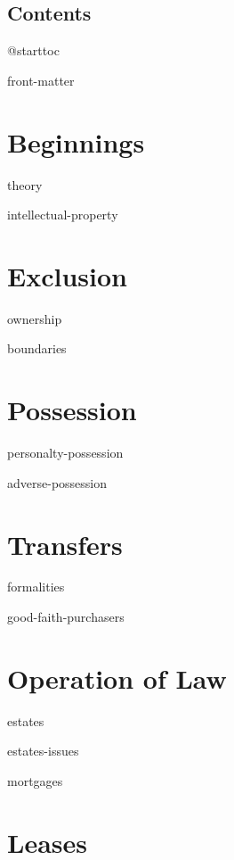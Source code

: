 \documentclass[12pt]{book}
\begin{document}
\sloppy
\raggedbottom
\frenchspacing
{}
\parskip=0pt



\makevolume

\chapter{Contents}

\csname @starttoc

\module front-matter

\mainmatter

\part{Beginnings}

\module theory

\module intellectual-property

\part{Exclusion}

\module ownership

\module boundaries

\part{Possession}

\module personalty-possession

\module adverse-possession


\part{Transfers}

\module formalities

\module good-faith-purchasers



\part{Operation of Law}

\module estates

\module estates-issues

\module mortgages



\part{Leases}
\end{document}
